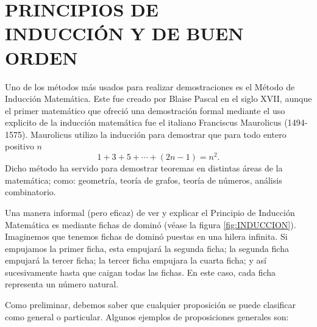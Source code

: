\chapter[PRINCIPIOS DE INDUCCIÓN Y DE BUEN ORDEN]{PRINCIPIOS DE \\ INDUCCIÓN Y DE BUEN ORDEN}\label{sec:induction}
\printchaptertableofcontents

Uno de los métodos más usados para realizar demostraciones es el Método de Inducción Matemática. Este fue creado por Blaise Pascal en el siglo XVII, aunque el primer matemático que ofreció una demostración formal mediante el uso explicito de la inducción matemática fue el italiano Franciscus Maurolicus (1494-1575). Maurolicus utilizo la inducción para demostrar que para todo entero positivo $n$
$$1 + 3 + 5 + \cdots + (2n-1) = n^2.$$
Dicho método ha servido para demostrar teoremas en distintas áreas de la matemática; como: geometría, teoría de grafos, teoría de números, análisis combinatorio.

Una manera informal (pero eficaz) de ver y explicar el Principio de Inducción Matemática es mediante fichas de dominó (véase la figura \ref{fig:INDUCCION}). Imaginemos que tenemos fichas de dominó puestas en una hilera infinita. Si empujamos la primer ficha, esta empujará la segunda ficha; la segunda ficha empujará la tercer ficha; la tercer ficha empujara la cuarta ficha; y así sucesivamente hasta que caigan todas las fichas. En este caso, cada ficha representa un número natural.

Como preliminar, debemos saber que cualquier proposición se puede clasificar como general o particular. Algunos ejemplos de proposiciones generales son:

